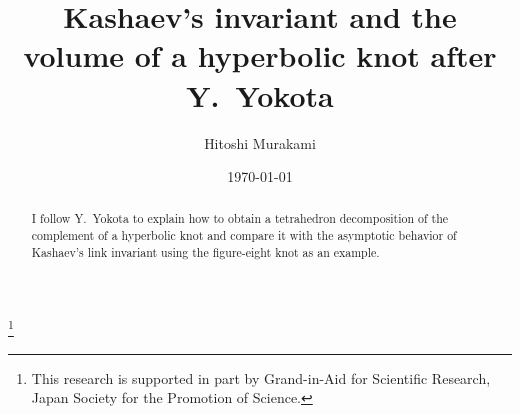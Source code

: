 \documentclass[a4paper]{amsart}
\date{\today}
\theoremstyle{plain}
\theoremstyle{definition}
\theoremstyle{remark}
\numberwithin{equation}{section}
\numberwithin{figure}{section}
\begin{document}
\title[Kashaev's invariant and the volume of a hyperbolic knot]
{Kashaev's invariant and the volume of a hyperbolic knot after Y.~Yokota}
\author{Hitoshi Murakami}
\address{
  Department of Mathematics,
  Tokyo Institute of Technology,
  Oh-okayama, Meguro, Tokyo 152-8551, Japan
}
\thanks{
This research is supported in part by Grand-in-Aid for Scientific Research,
Japan Society for the Promotion of Science.
}
\begin{abstract}
I follow Y.~Yokota to explain how to obtain a tetrahedron decomposition
of the complement of a hyperbolic knot and compare it with the asymptotic
behavior of Kashaev's link invariant using the figure-eight knot as an example.
\end{abstract}
\maketitle
\end{document}
